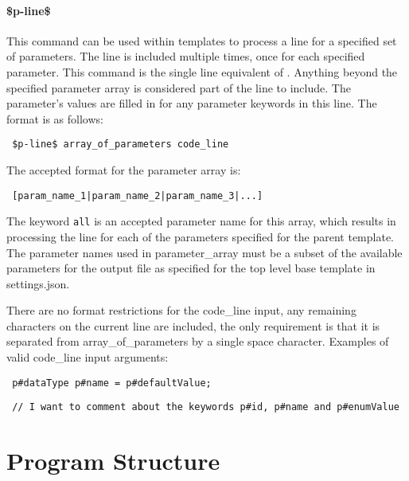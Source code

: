 \documentclass{settings/TU_Delft_Report}
\begin{document}
\subsubsection{\$p-line\$} \label{p-line}
This command can be used within templates to process a line for a specified set of parameters. The line is included multiple times, once for each specified parameter. This command is the single line equivalent of . Anything beyond the specified parameter array is considered part of the line to include. The parameter's values are filled in for any parameter keywords in this line. The format is as follows:
\begin{lstlisting}
 $p-line$ array_of_parameters code_line
\end{lstlisting}
The accepted format for the parameter array is:
\begin{lstlisting}
 [param_name_1|param_name_2|param_name_3|...]
\end{lstlisting}
The keyword \lstinline{all} is an accepted parameter name for this array, which results in processing the line for each of the parameters specified for the parent template.\\

The parameter names used in parameter\_array must be a subset of the available parameters for the output file as specified for the top level base template in settings.json.

There are no format restrictions for the code\_line input, any remaining characters on the current line are included, the only requirement is that it is separated from array\_of\_parameters by a single space character. Examples of valid code\_line input arguments:
\begin{lstlisting}
 p#dataType p#name = p#defaultValue;
\end{lstlisting}

\begin{lstlisting}
 // I want to comment about the keywords p#id, p#name and p#enumValue
\end{lstlisting}

\chapter{Program Structure}
\end{document}

